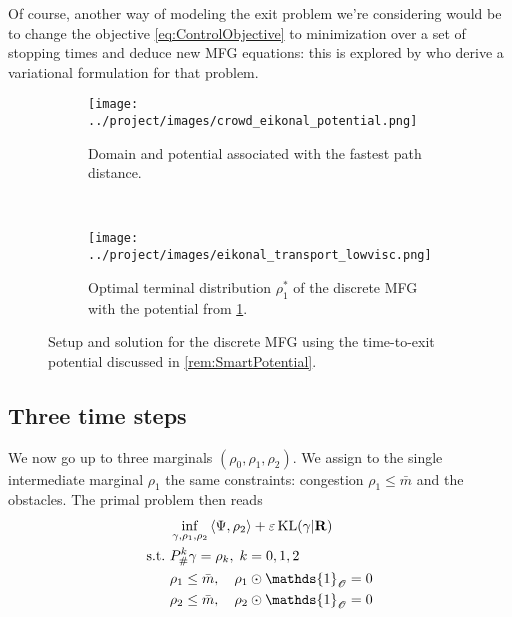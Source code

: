 \documentclass[../report.tex]{subfiles}
\begin{document}
Of course, another way of modeling the exit problem we're considering would be to change the objective \eqref{eq:ControlObjective} to minimization over a set of stopping times and deduce new MFG equations: this is explored by \textcite{benamou:hal-01295299} who derive a variational formulation for that problem.


\begin{figure}
	\centering
	\begin{subfigure}[b]{.45\linewidth}
		\centering
		\texttt{[image: ../project/images/crowd\_eikonal\_potential.png]}
		\caption{Domain and potential associated with the fastest path distance.}\label{fig:CrowdShortedPathPotential}
	\end{subfigure}~
	\begin{subfigure}[b]{.4\linewidth}
		\centering
		\texttt{[image: ../project/images/eikonal\_transport\_lowvisc.png]}
		\caption{Optimal terminal distribution $\rho^*_1$ of the discrete MFG with the potential from \cref{fig:CrowdShortedPathPotential}.}\label{fig:2MargEikonalGame}
	\end{subfigure}
	\caption{Setup and solution for the discrete MFG using the time-to-exit potential discussed in \cref{rem:SmartPotential}.}
\end{figure}


\subsection{Three time steps}

We now go up to three marginals $(\rho_0,\rho_1,\rho_2)$. We assign to the single intermediate marginal $\rho_1$ the same constraints: congestion $\rho_1 \leq \bar{m}$ and the obstacles. The primal problem then reads
\begin{equation}
\begin{aligned}
	&\inf_{\gamma,\rho_1,\rho_2}{} \langle \Psi, \rho_2\rangle + \epsilon \KL(\gamma | \bfR) \\
	\suchthat \ & P^k_\#\gamma = \rho_k,\; k = 0,1,2 \\
	& \rho_1 \leq \bar{m}, \quad \rho_1\odot\mathds{1}_{\mathscr O} = 0\\
	& \rho_2 \leq \bar{m}, \quad \rho_2\odot\mathds{1}_{\mathscr O} = 0
\end{aligned}
\end{equation}
\end{document}
